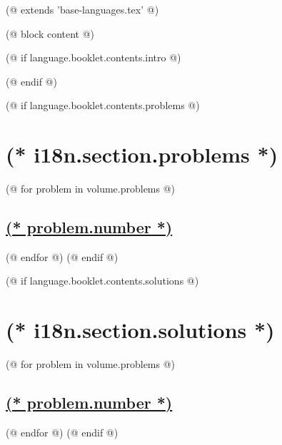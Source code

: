(@ extends 'base-languages.tex' @)

(@ block content @)
    \setcounter{volume}{(* volume.number *)}%
    \pagestyle{main}

    (@ if language.booklet.contents.intro @)
        \thispagestyle{first}
        \afterpage{\aftergroup\restoregeometry}
        
        \newpage
    (@ endif @)

    (@ if language.booklet.contents.problems @)
        \section{(* i18n.section.problems *)}
        \pagestyle{problems}
        (@ for problem in volume.problems @)%
            \setcounter{problem}{(* problem.number *)}%
            \hypersetup{linkcolor=black}%
            \subsection{%
                \texorpdfstring{%
                    \hyperref[ssc:(* problem.id *)-answer]{(* problem.number *)}%
                }{%
                    (* problem.number *). (* problem.id *)%
                }%
            }%
            \label{ssc:(* problem.id*)-problem}%
            \hypersetup{linkcolor=colour-link}%
        (@ endfor @)
        \newpage
    (@ endif @)

    (@ if language.booklet.contents.solutions @)
        \section{(* i18n.section.solutions *)}
        \pagestyle{solutions}
        (@ for problem in volume.problems @)%
            \setcounter{problem}{(* problem.number *)}%
            \setcounter{equation}{0}%
            \setcounter{table}{0}%
            \setcounter{figure}{0}%
            \hypersetup{linkcolor=black}%
            \subsection{%
                \texorpdfstring{%
                    \hyperref[ssc:(* problem.id *)-problem]{(* problem.number *)}%
                }{%
                    (* problem.number *). (* problem.id *)%
                }%
            }%
            \label{ssc:(* problem.id*)-solution}%
            \hypersetup{linkcolor=colour-link}%
        (@ endfor @)
        \newpage
    (@ endif @)

